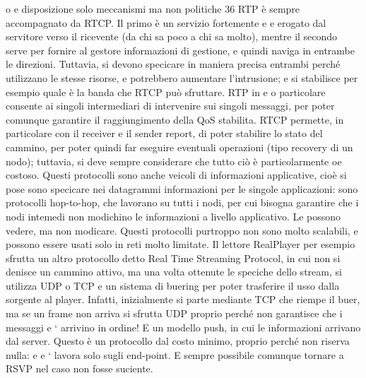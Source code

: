 o
e
disposizione solo meccanismi ma non politiche
36
RTP è sempre accompagnato da RTCP. Il primo è un servizio fortemente
e
e
erogato dal servitore verso il ricevente (da chi sa poco a chi sa molto), mentre
il secondo serve per fornire al gestore informazioni di gestione, e quindi naviga
in entrambe le direzioni. Tuttavia, si devono specicare in maniera precisa entrambi perché utilizzano le stesse risorse,
e potrebbero aumentare l'intrusione;
e
si stabilisce per esempio quale è la banda che RTCP può sfruttare. RTP in
e
o
particolare consente ai singoli intermediari di intervenire sui singoli messaggi,
per poter comunque garantire il raggiungimento della QoS stabilita. RTCP permette, in particolare con il receiver e il
sender report, di poter stabilire lo stato
del cammino, per poter quindi far eseguire eventuali operazioni (tipo recovery
di un nodo); tuttavia, si deve sempre considerare che tutto ciò è particolarmente
oe
costoso.
Questi protocolli sono anche veicoli di informazioni applicative, cioè si pose
sono specicare nei datagrammi informazioni per le singole applicazioni: sono
protocolli hop-to-hop, che lavorano su tutti i nodi, per cui bisogna garantire che
i nodi intemedi non modichino le informazioni a livello applicativo. Le possono
vedere, ma non modicare.
Questi protocolli purtroppo non sono molto scalabili, e possono essere usati
solo in reti molto limitate. Il lettore RealPlayer per esempio sfrutta un altro
protocollo detto Real Time Streaming Protocol, in cui non si denisce un cammino attivo, ma una volta ottenute le
speciche dello stream, si utilizza UDP
o TCP e un sistema di buering per poter trasferire il usso dalla sorgente al
player. Infatti, inizialmente si parte mediante TCP che riempe il buer, ma se
un frame non arriva si sfrutta UDP proprio perché non garantisce che i messaggi
e
`
arrivino in ordine! E un modello push, in cui le informazioni arrivano dal server. Questo è un protocollo dal costo
minimo, proprio perché non riserva nulla:
e
e
`
lavora solo sugli end-point. E sempre possibile comunque tornare a RSVP nel
caso non fosse suciente.
